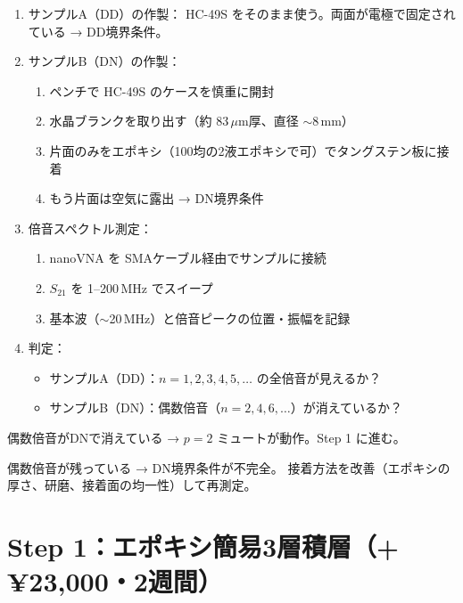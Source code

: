 \documentclass[11pt,a4paper]{article}
\def\textbf#1{#1}%
\begin{document}
\begin{enumerate}[leftmargin=*]
\item \textbf{サンプルA（DD）の作製}：
  HC-49S をそのまま使う。両面が電極で固定されている → DD境界条件。

\item \textbf{サンプルB（DN）の作製}：
  \begin{enumerate}
  \item ペンチで HC-49S のケースを慎重に開封
  \item 水晶ブランクを取り出す（約 83\,$\mu$m厚、直径 $\sim$8\,mm）
  \item \textbf{片面のみ}をエポキシ（100均の2液エポキシで可）でタングステン板に接着
  \item もう片面は空気に露出 → DN境界条件
  \end{enumerate}

\item \textbf{倍音スペクトル測定}：
  \begin{enumerate}
  \item nanoVNA を SMAケーブル経由でサンプルに接続
  \item $S_{21}$ を 1--200\,MHz でスイープ
  \item 基本波（$\sim$20\,MHz）と倍音ピークの位置・振幅を記録
  \end{enumerate}

\item \textbf{判定}：
  \begin{itemize}
  \item サンプルA（DD）：$n = 1, 2, 3, 4, 5, \ldots$ の全倍音が見えるか？
  \item サンプルB（DN）：偶数倍音（$n = 2, 4, 6, \ldots$）が消えているか？
  \end{itemize}
\end{enumerate}

\begin{tcolorbox}[colback=red!5,colframe=red!60!black,title=Step 0 の GO/STOP]
\textbf{偶数倍音がDNで消えている} → $p = 2$ ミュートが動作。Step 1 に進む。

\textbf{偶数倍音が残っている} → DN境界条件が不完全。
接着方法を改善（エポキシの厚さ、研磨、接着面の均一性）して再測定。
\end{tcolorbox}


\section{Step 1：エポキシ簡易3層積層（+¥23,000・2週間）}
\label{sec:step1}
\end{document}
